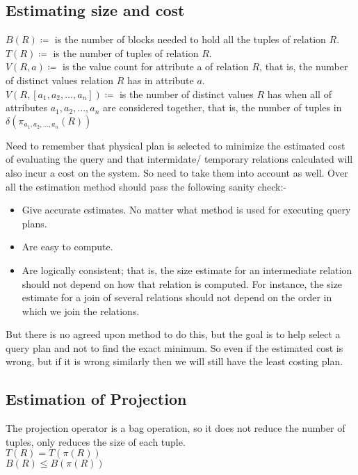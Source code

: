 \subsection{Estimating size and cost}
$B(R) \coloneqq$ is the number of blocks needed to hold all the tuples of relation $R$.\\
$T(R) \coloneqq$ is the number of tuples of relation $R$.\\
$V(R,a) \coloneqq$ is the value count for attribute a of relation $R$, that is, the number of distinct values relation $R$ has in attribute $a$.\\
$V(R, [ a_1 , a_2,..., a_n]) \coloneqq$ is the number of distinct values $R$ has when all of attributes $a_1, a_2,..., a_n$ are considered together, that is, the number of tuples in $\delta(\pi_{a_1,a_2,...,a_n}(R))$
\par Need to remember that physical plan is selected to minimize the estimated cost of evaluating the query and that intermidate/ temporary relations calculated will also incur a cost on the system. So need to take them into account as well. Over all the estimation method should pass the following sanity check:-
\begin{itemize}
    \item Give accurate estimates. No matter what method is used for executing query plans.
    \item Are easy to compute.
    \item Are logically consistent; that is, the size estimate for an intermediate re­lation should not depend on how that relation is computed. For instance, the size estimate for a join of several relations should not depend on the order in which we join the relations.
\end{itemize}
But there is no agreed upon method to do this, but the goal is to help select a query plan and not to find the exact minimum. So even if the estimated cost is wrong, but if it is wrong similarly then we will still have the least costing plan.

\subsection{Estimation of Projection}
The projection operator is a bag operation, so it does not reduce the number of tuples, only reduces the size of each tuple.\\
$T(R) = T(\pi(R))$\\
$B(R) \leq B(\pi(R))$

